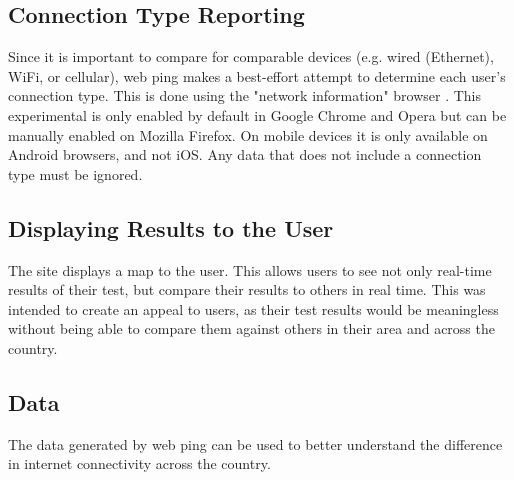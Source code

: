 \subsection{Connection Type Reporting}
Since it is important to compare \rtts for comparable devices (e.g. wired (Ethernet), WiFi, or cellular), web ping makes a best-effort attempt to determine each user's connection type. This is done using the "network information" browser \api. This experimental \api is only enabled by default in Google Chrome and Opera but can be manually enabled on Mozilla Firefox. On mobile devices it is only available on Android browsers, and not iOS. Any data that does not include a connection type must be ignored.

\subsection{Displaying Results to the User}
The site displays a map to the user. This allows users to see not only real-time results of their test, but compare their results to others in real time. This was intended to create an appeal to users, as their test results would be meaningless without being able to compare them against others in their area and across the country.

\subsection{Data}
The data generated by web ping can be used to better understand the difference in internet connectivity across the country.

    
    
    